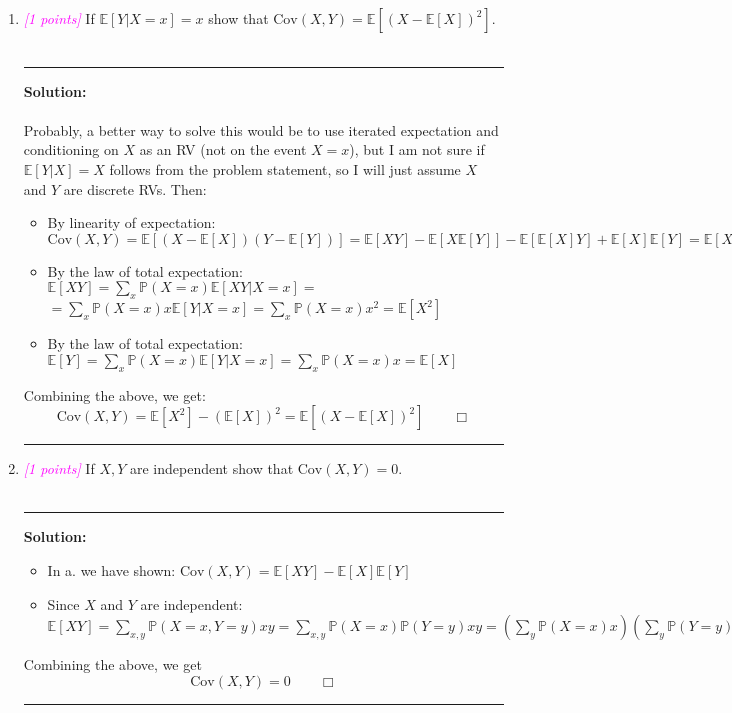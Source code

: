 \documentclass{article}
\newcommand{\1}{\mathbf{1}}
\newcommand{\E}{\mathbb{E}}
\newcommand{\points}[1]{\small\textcolor{magenta}{\emph{[#1 points]}} \normalsize}
\begin{document}
\begin{enumerate}
\item \points{1} If $\E[Y|X=x] = x$ show that $\text{Cov}(X,Y) = \E[(X-\E[X])^2]$.  
\\
\\
\noindent\rule{\textwidth}{1pt}
{\bf Solution:}\\
\\
Probably, a better way to solve this would be to use iterated expectation and conditioning on $X$ as an RV (not on the event $X=x$), but I am not sure if $\E[Y|X] = X$ follows from the problem statement, so I will just assume $X$ and $Y$ are discrete RVs. Then:
\begin{itemize}
    \item By linearity of expectation: $\text{Cov}(X,Y)=\E[(X-\E[X])(Y-\E[Y])] = \E[XY] - \E[X\E[Y]] - \E[\E[X]Y] + \E[X]\E[Y] = \E[XY] - \E[X]\E[Y]$ 
    
    \item By the law of total expectation: $\E[XY] = \sum_x \mathbb{P}(X=x)\E[XY\vert X=x] = $\\$ =\sum_x \mathbb{P}(X=x)x\E[Y\vert X=x] = \sum_x \mathbb{P}(X=x)x^2 = \E[X^2]$
    \item By the law of total expectation: $\E[Y] = \sum_x \mathbb{P}(X=x)\E[Y\vert X=x] = \sum_x \mathbb{P}(X=x)x = \E[X]$
\end{itemize}
Combining the above, we get:
$$\text{Cov}(X,Y) = \E[X^2] - (\E[X])^2 = \E[(X-\E[X])^2] \qquad \Box$$



\noindent\rule{\textwidth}{1pt}

\item \points{1} If $X,Y$ are independent show that $\text{Cov}(X,Y)=0$.
\\
\\
\noindent\rule{\textwidth}{1pt}
{\bf Solution:}\\
\begin{itemize}
    \item In a. we have shown: $\text{Cov}(X,Y)= \E[XY] - \E[X]\E[Y]$ 
    \item Since $X$ and $Y$ are independent: $\E[XY] = \sum_{x,y}\mathbb{P}(X=x, Y= y)xy = \sum_{x,y}\mathbb{P}(X=x)\mathbb{P}(Y= y)xy = \left(\sum_{y}\mathbb{P}(X=x)x\right)\left(\sum_{y}\mathbb{P}(Y= y)y\right) = \E[X]\E[Y]$
\end{itemize}
Combining the above, we get $$\text{Cov}(X,Y) = 0 \qquad \Box$$

\noindent\rule{\textwidth}{1pt}

\end{enumerate}
\end{document}
